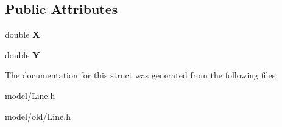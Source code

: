 \subsection*{Public Attributes}
\begin{DoxyCompactItemize}
\item 
\hypertarget{structPoint_a9a3d900d37caa93c8266045f9a15ddfd}{double {\bfseries X}}\label{structPoint_a9a3d900d37caa93c8266045f9a15ddfd}

\item 
\hypertarget{structPoint_afd3632a85aefc15a129a8ebc4b8412b9}{double {\bfseries Y}}\label{structPoint_afd3632a85aefc15a129a8ebc4b8412b9}

\end{DoxyCompactItemize}


The documentation for this struct was generated from the following files\-:\begin{DoxyCompactItemize}
\item 
model/Line.\-h\item 
model/old/Line.\-h\end{DoxyCompactItemize}

